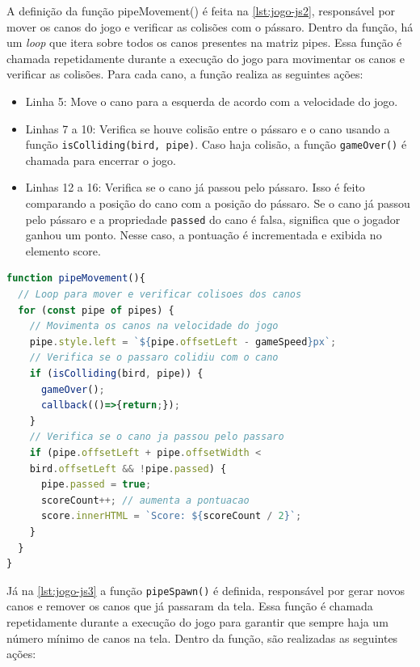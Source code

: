 A definição da função pipeMovement() é feita na \autoref{lst:jogo-js2}, responsável por mover os canos do jogo e verificar as colisões com o pássaro. Dentro da função, há um \textit{loop} que itera sobre todos os canos presentes na matriz pipes. Essa função é chamada repetidamente durante a execução do jogo para movimentar os canos e verificar as colisões. Para cada cano, a função realiza as seguintes ações:
\begin{itemize}
    \item Linha 5: Move o cano para a esquerda de acordo com a velocidade do jogo.

    \item Linhas 7 a 10: Verifica se houve colisão entre o pássaro e o cano usando a função \texttt{isColliding(bird, pipe)}. Caso haja colisão, a função \texttt{gameOver()} é chamada para encerrar o jogo.

    \item Linhas 12 a 16: Verifica se o cano já passou pelo pássaro. Isso é feito comparando a posição do cano com a posição do pássaro. Se o cano já passou pelo pássaro e a propriedade \texttt{passed} do cano é falsa, significa que o jogador ganhou um ponto. Nesse caso, a pontuação é incrementada e exibida no elemento score.
\end{itemize}

\newpage
\begin{lstlisting}[language=TypeScript, caption={Projeto exemplo em JS (Parte 2): Função de movimentação dos canos}, label=lst:jogo-js2]
function pipeMovement(){
  // Loop para mover e verificar colisoes dos canos
  for (const pipe of pipes) {
    // Movimenta os canos na velocidade do jogo
    pipe.style.left = `${pipe.offsetLeft - gameSpeed}px`;
    // Verifica se o passaro colidiu com o cano
    if (isColliding(bird, pipe)) {
      gameOver();
      callback(()=>{return;});
    }
    // Verifica se o cano ja passou pelo passaro
    if (pipe.offsetLeft + pipe.offsetWidth <
    bird.offsetLeft && !pipe.passed) {
      pipe.passed = true;
      scoreCount++; // aumenta a pontuacao
      score.innerHTML = `Score: ${scoreCount / 2}`;
    }
  }
}
\end{lstlisting}

Já na \autoref{lst:jogo-js3} a função \texttt{pipeSpawn()} é definida, responsável por gerar novos canos e remover os canos que já passaram da tela. Essa função é chamada repetidamente durante a execução do jogo para garantir que sempre haja um número mínimo de canos na tela. Dentro da função, são realizadas as seguintes ações:

